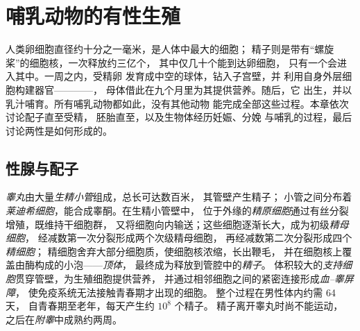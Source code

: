 \chapter{哺乳动物的有性生殖}\label{ch:b2:mammal-reproduction}

人类卵细胞直径约十分之一毫米，是人体中最大的细胞；
精子则是带有“螺旋桨”的细胞核，一次释放约三亿个，
其中仅几十个能到达卵细胞，
只有一个会进入其中。一周之内，受精卵
发育成中空的球体，钻入子宫壁，并
利用自身外层细胞构建器官————，
母体借此在九个月里为其提供营养。随后，它
出生，并以乳汁哺育。所有哺乳动物都如此，没有其他动物
能完成全部这些过程。本章依次讨论配子直至受精，
胚胎直至，以及生物体经历妊娠、分娩
与哺乳的过程，最后讨论两性是如何形成的。

\section{性腺与配子}

\begin{definition}[睾丸与精子发生]\label{def:b2:mammal-reproduction:testis}
\emph{睾丸}由大量\emph{生精小管}组成，总长可达数百米，
其管壁产生精子；
小管之间分布着\emph{莱迪希细胞}，能合成睾酮。在生精小管壁中，
位于外缘的\emph{精原细胞}通过有丝分裂增殖，既维持干细胞群，
又将细胞向内输送；这些细胞逐渐长大，成为初级\emph{精母细胞}，
经减数第一次分裂形成两个次级精母细胞，
再经减数第二次分裂形成四个\emph{精细胞}；
精细胞舍弃大部分细胞质，使细胞核浓缩，长出鞭毛，
并在细胞核上覆盖由酶构成的小泡——\emph{顶体}，
最终成为释放到管腔中的\emph{精子}。
体积较大的\emph{支持细胞}贯穿管壁，为生殖细胞提供营养，
并通过相邻细胞之间的紧密连接形成\emph{血–睾屏障}，
使免疫系统无法接触青春期才出现的细胞。
整个过程在男性体内约需 \num{64} 天，
自青春期至老年，每天产生约 $10^{8}$ 个精子。
精子离开睾丸时尚不能运动，
之后在\emph{附睾}中成熟约两周。
\end{definition}

